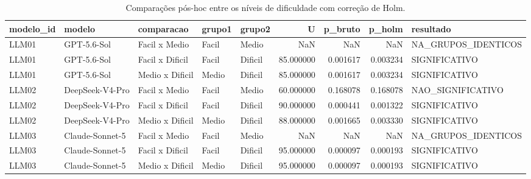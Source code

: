 \begin{table}
\caption{Comparações pós-hoc entre os níveis de dificuldade com correção de Holm.}
\label{tab:posthoc_dificuldade}
\begin{tabular}{lllllrrrl}
\toprule
modelo\_id & modelo & comparacao & grupo1 & grupo2 & U & p\_bruto & p\_holm & resultado \\
\midrule
LLM01 & GPT-5.6-Sol & Facil x Medio & Facil & Medio & NaN & NaN & NaN & NA\_GRUPOS\_IDENTICOS \\
LLM01 & GPT-5.6-Sol & Facil x Dificil & Facil & Dificil & 85.000000 & 0.001617 & 0.003234 & SIGNIFICATIVO \\
LLM01 & GPT-5.6-Sol & Medio x Dificil & Medio & Dificil & 85.000000 & 0.001617 & 0.003234 & SIGNIFICATIVO \\
LLM02 & DeepSeek-V4-Pro & Facil x Medio & Facil & Medio & 60.000000 & 0.168078 & 0.168078 & NAO\_SIGNIFICATIVO \\
LLM02 & DeepSeek-V4-Pro & Facil x Dificil & Facil & Dificil & 90.000000 & 0.000441 & 0.001322 & SIGNIFICATIVO \\
LLM02 & DeepSeek-V4-Pro & Medio x Dificil & Medio & Dificil & 88.000000 & 0.001665 & 0.003330 & SIGNIFICATIVO \\
LLM03 & Claude-Sonnet-5 & Facil x Medio & Facil & Medio & NaN & NaN & NaN & NA\_GRUPOS\_IDENTICOS \\
LLM03 & Claude-Sonnet-5 & Facil x Dificil & Facil & Dificil & 95.000000 & 0.000097 & 0.000193 & SIGNIFICATIVO \\
LLM03 & Claude-Sonnet-5 & Medio x Dificil & Medio & Dificil & 95.000000 & 0.000097 & 0.000193 & SIGNIFICATIVO \\
\bottomrule
\end{tabular}
\end{table}
